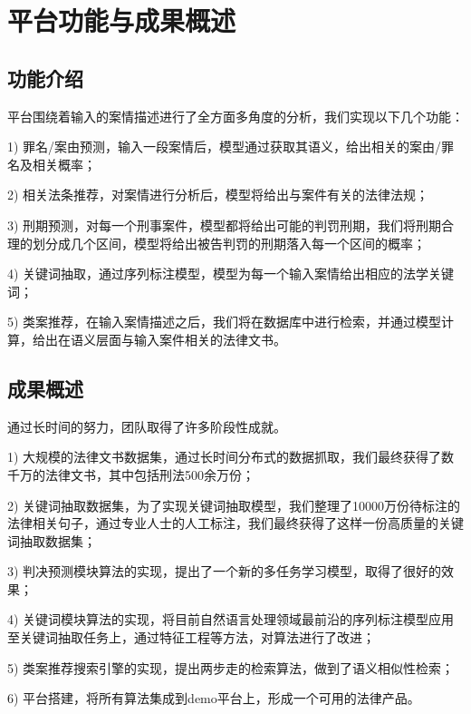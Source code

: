 \chapter{平台功能与成果概述}

\section{功能介绍}
平台围绕着输入的案情描述进行了全方面多角度的分析，我们实现以下几个功能：

1)	罪名/案由预测，输入一段案情后，模型通过获取其语义，给出相关的案由/罪名及相关概率；

2)	相关法条推荐，对案情进行分析后，模型将给出与案件有关的法律法规；

3)	刑期预测，对每一个刑事案件，模型都将给出可能的判罚刑期，我们将刑期合理的划分成几个区间，模型将给出被告判罚的刑期落入每一个区间的概率；

4)	关键词抽取，通过序列标注模型，模型为每一个输入案情给出相应的法学关键词；

5)	类案推荐，在输入案情描述之后，我们将在数据库中进行检索，并通过模型计算，给出在语义层面与输入案件相关的法律文书。


\section{成果概述}

通过长时间的努力，团队取得了许多阶段性成就。

1)	大规模的法律文书数据集，通过长时间分布式的数据抓取，我们最终获得了数千万的法律文书，其中包括刑法500余万份；

2)	关键词抽取数据集，为了实现关键词抽取模型，我们整理了10000万份待标注的法律相关句子，通过专业人士的人工标注，我们最终获得了这样一份高质量的关键词抽取数据集；

3)	判决预测模块算法的实现，提出了一个新的多任务学习模型，取得了很好的效果；

4)	关键词模块算法的实现，将目前自然语言处理领域最前沿的序列标注模型应用至关键词抽取任务上，通过特征工程等方法，对算法进行了改进；

5)	类案推荐搜索引擎的实现，提出两步走的检索算法，做到了语义相似性检索；

6)	平台搭建，将所有算法集成到demo平台上，形成一个可用的法律产品。
